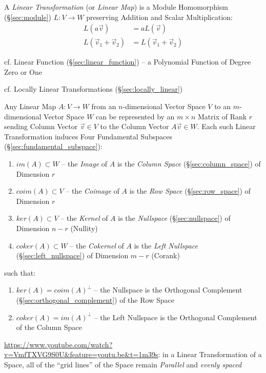 A \emph{Linear Transformation} (or \emph{Linear Map}) is a Module Homomorphism
(\S\ref{sec:module}) $L : V \rightarrow W$ preserving Addition and Scalar
Multiplication:
\begin{align*}
  L(a\vec{v})              & = aL(\vec{v}) \\
  L(\vec{v}_1 + \vec{v}_2) & = L(\vec{v}_1 + \vec{v}_2)
\end{align*}

\fist cf. Linear Function (\S\ref{sec:linear_function}) -- a Polynomial
Function of Degree Zero or One

\fist cf. Locally Linear Transformations (\S\ref{sec:locally_linear})

Any Linear Map $A : V \rightarrow W$ from an $n$-dimensional Vector Space $V$
to an $m$-dimensional Vector Space $W$ can be represented by an $m \times n$
Matrix of Rank $r$ sending Column Vector $\vec{v} \in V$ to the Column Vector
$A\vec{v} \in W$. Each such Linear Transformation induces Four Fundamental
Subspaces (\S\ref{sec:fundamental_subspace}):
\begin{enumerate}
  \item $im(A) \subset W$ -- the \emph{Image} of $A$ is the \emph{Column Space}
    (\S\ref{sec:column_space}) of Dimension $r$
  \item $coim(A) \subset V$ -- the \emph{Coimage} of $A$ is the \emph{Row Space}
    (\S\ref{sec:row_space}) of Dimension $r$
  \item $ker(A) \subset V$ -- the \emph{Kernel} of $A$ is the \emph{Nullspace}
    (\S\ref{sec:nullspace}) of Dimension $n - r$ (Nullity) %
  \item $coker(A) \subset W$ -- the \emph{Cokernel} of $A$ is the \emph{Left
    Nullspace} (\S\ref{sec:left_nullspace}) of Dimension $m - r$ (Corank)
\end{enumerate}
such that:
\begin{enumerate}
  \item $ker(A) = coim(A)^\bot$ -- the Nullspace is the Orthogonal Complement
    (\S\ref{sec:orthogonal_complement}) of the Row Space
  \item $coker(A) = im(A)^\bot$ -- the Left Nullspace is the Orthogonal
    Complement of the Column Space
\end{enumerate}

\url{https://www.youtube.com/watch?v=VmfTXVG9S0U&feature=youtu.be&t=1m39s}: in
a Linear Transformation of a Space, all of the ``grid lines'' of the Space
remain \emph{Parallel} and \emph{evenly spaced}


